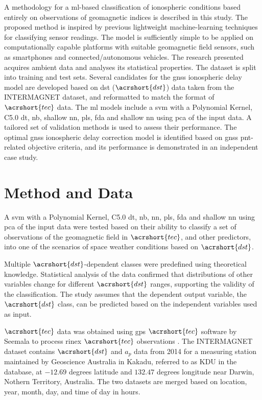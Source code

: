 \documentclass[sn-mathphys-num]{sn-jnl}%
\begin{document}
A methodology for a \acrlong{ml}-based classification of ionospheric conditions based entirely on observations of geomagnetic indices is described in this study. The proposed method is inspired by previous lightweight machine-learning techniques \cite{filjar2020comparison} for classifying sensor readings. The model is sufficiently simple to be applied on computationally capable platforms with suitable geomagnetic field sensors, such as smartphones and connected/autonomous vehicles. The research presented acquires ambient data and analyses its statistical properties. The dataset is split into training and test sets. Several candidates for the \acrshort{gnss} ionospheric delay model are developed based on \acrlong{dst} ($\acrshort{dst}$) data taken from the INTERMAGNET \cite{Intermagnet2022-cj} dataset, and reformatted to match the format of $\acrshort{tec}$ data. The \acrfull{ml} models include a \acrfull{svm} with a Polynomial Kernel, C5.0 \acrfull{dt}, \acrfull{nb}, shallow \acrfull{nn}, \acrfull{pls}, \acrfull{fda} and shallow \acrfull{nn} using \acrfull{pca} of the input data. A tailored set of validation methods is used to assess their performance. The optimal \acrshort{gnss} ionospheric delay correction model is identified based on \acrshort{gnss} \acrshort{pnt}-related objective criteria, and its performance is demonstrated in an independent case study.

\section{Method and Data}
\label{sec:Dataset}

A \acrfull{svm} with a Polynomial Kernel, C5.0 \acrfull{dt}, \acrfull{nb}, \acrfull{nn}, \acrfull{pls}, \acrfull{fda} and shallow \acrfull{nn} using \acrfull{pca} of the input data were tested based on their ability to classify a set of observations of the geomagnetic field in $\acrshort{tec}$, and other predictors, into one of the scenarios of space weather conditions based on $\acrshort{dst}$. 

Multiple $\acrshort{dst}$-dependent classes were predefined using theoretical knowledge. Statistical analysis of the data confirmed that distributions of other variables change for different $\acrshort{dst}$ ranges, supporting the validity of the classification. The study assumes that the dependent output variable, the $\acrshort{dst}$ class, can be predicted based on the independent variables used as input.

$\acrshort{tec}$ data was obtained using \acrshort{gps} $\acrshort{tec}$ software by Seemala to process \acrshort{rinex} $\acrshort{tec}$ observations \cite{SEEMALA202363}. The INTERMAGNET \cite{Intermagnet2022-cj} dataset contains $\acrshort{dst}$ and $a_{p}$ data from 2014 for a measuring station maintained by Geoscience Australia in Kakadu, referred to as KDU in the database, at $-12.69$ degrees latitude and $132.47$ degrees longitude near Darwin, Nothern Territory, Australia. The two datasets are merged based on location, year, month, day, and time of day in hours.
\end{document}
